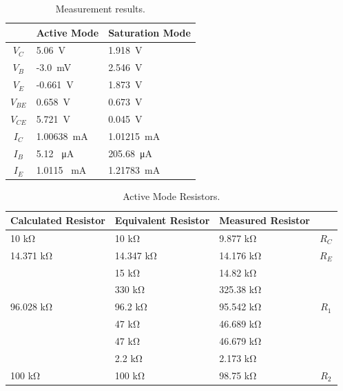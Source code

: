 \documentclass{../../ece-report}
\begin{document}
\begin{table}[h!]
  \centering
  \begin{tabular}{c l l}\toprule
      & \textbf{Active Mode} & \textbf{Saturation Mode} \\
    \midrule
    $V_C$     & 5.06~\si{\V}   &  1.918~\si{\V}  \\
    $V_B$     & -3.0~\si{\mV}  &  2.546~\si{\V}  \\
    $V_E$     & -0.661~\si{\V} &  1.873~\si{\V}  \\
\midrule
    $V_{BE}$  & 0.658~\si{\V}   & 0.673~\si{\V}   \\
    $V_{CE}$  & 5.721~\si{\V}   & 0.045~\si{\V}   \\
    $I_C$     & 1.00638~\si{\mA} & 1.01215~\si{\mA}\\
    $I_B$     & 5.12 ~\si{\uA}   & 205.68~\si{\uA} \\
    $I_E$     & 1.0115 ~\si{\mA}   & 1.21783~\si{\mA}\\
\bottomrule
\end{tabular}
\caption{Measurement results.}
\label{tab:meas_results}
\end{table}


\begin{table}[h!]
  \centering
  \begin{tabular}{l l l c}\toprule
    \textbf{Calculated Resistor} & \textbf{Equivalent Resistor} & \textbf{Measured Resistor} & \\
    \midrule

10 \si{\kohm} & 10 \si{\kohm} & 9.877 \si{\kohm} & $R_C$ \\
          \midrule
14.371 \si{\kohm}    & 14.347 \si{\kohm}    & 14.176 \si{\kohm}    & $R_E$ \\
          & 15 \si{\kohm}    & 14.82   \si{\kohm}  &       \\
          & 330 \si{\kohm}    & 325.38   \si{\kohm}  &       \\
          \midrule
96.028 \si{\kohm}     & 96.2 \si{\kohm}     & 95.542 \si{\kohm}  & $R_1$ \\
          & 47 \si{\kohm}     & 46.689 \si{\kohm}   &       \\
          & 47 \si{\kohm}     & 46.679 \si{\kohm}   &       \\
          & 2.2 \si{\kohm}    &  2.173 \si{\kohm}   &       \\
\midrule
100 \si{\kohm}     & 100 \si{\kohm}     & 98.75 \si{\kohm}  & $R_2$ \\
\bottomrule
\end{tabular}
\caption{Active Mode Resistors.}
\label{tab:active_resistors}
\end{table}
\end{document}
